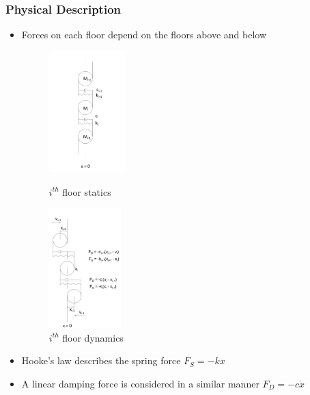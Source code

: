 \documentclass[xcolor=svgnames,9pt]{beamer}
\theoremstyle{remark}
\begin{document}
		\begin{frame}
  			\frametitle{Physical Description}
			\begin{itemize}
				\item Forces on each floor depend on the floors above and below
				\begin{figure}
 				 	\begin{minipage}[b]{0.4\textwidth}
						\centering
    						\includegraphics[width=30mm]{SPRINGS-Model2A.jpg}
    						\caption{$i^{th}$ floor statics}
						\label{Springs2}
  					\end{minipage}
 					\hfill
					\begin{minipage}[b]{0.4\textwidth}
						\centering
 				  		\includegraphics[width=28mm]{SPRINGS-Model3A.jpg}
    						\caption{$i^{th}$ floor dynamics}
						\label{Springs3}
 					\end{minipage}
				\end{figure}
				\item Hooke's law describes the spring force $F_S = - kx$
				\item A linear damping force is considered in a similar manner $F_D = - c\dot{x}$
			\end{itemize}

		\end{frame}
\end{document}
